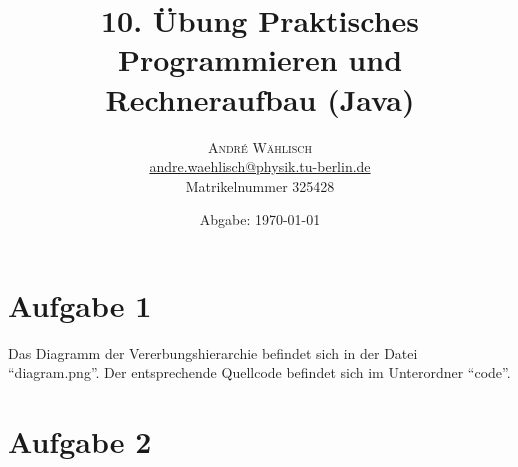 \documentclass{scrartcl}
\begin{document}
\title{10. Übung Praktisches Programmieren und Rechneraufbau (Java)}

\date{Abgabe: \today}

\author{
\large
\textsc{André Wählisch}\\[2mm]
\normalsize \href{mailto:andre.waehlisch@physik.tu-berlin.de}{andre.waehlisch@physik.tu-berlin.de} \\
\normalsize Matrikelnummer 325428 
}

\maketitle

\section*{Aufgabe 1}

Das Diagramm der Vererbungshierarchie befindet sich in der Datei \enquote{diagram.png}. Der entsprechende Quellcode befindet sich im Unterordner \enquote{code}.

\clearpage

\section*{Aufgabe 2}
\end{document}
